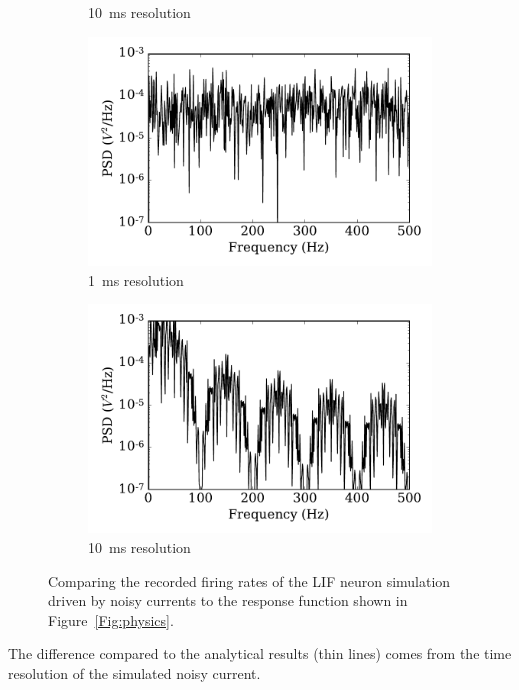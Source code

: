 \begin{figure}
\begin{subfigure}[t]{0.49\textwidth}
			\caption{10~ms resolution}
			\label{Fig:gaussian-10}
		\end{subfigure}
		\begin{subfigure}[t]{0.49\textwidth}
			\includegraphics[width=\textwidth]{pics_iconip/psd_dt1.pdf}
			\caption{1~ms resolution}
			\label{Fig:spectrum-1}
		\end{subfigure}
		\begin{subfigure}[t]{0.49\textwidth}
			\includegraphics[width=\textwidth]{pics_iconip/psd_dt10.pdf}
			\caption{10~ms resolution}
			\label{Fig:spectrum-10}
		\end{subfigure}
		\caption{Comparing the recorded firing rates of the LIF neuron simulation driven by noisy currents to the response function shown in Figure~\ref{Fig:physics}.}
		\label{Fig:lif_curr}
	\end{figure}
	
	The difference compared to the analytical results (thin lines) comes from the time resolution of the simulated noisy current.

